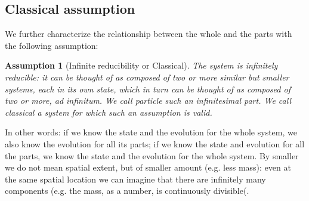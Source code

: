 \documentclass[aps,pra,10pt,twocolumn,floatfix,nofootinbib]{revtex4-1}
\newtheorem{assump}{Assumption}
\theoremstyle{definition}
\begin{document}
\subsection{Classical assumption}




We further characterize the relationship between the whole and the parts with the following assumption:

\begin{assump}[Infinite reducibility or Classical]\label{classical}
The system is infinitely reducible: it can be thought of as composed of two or more similar but smaller systems, each in its own state, which in turn can be thought of as composed of two or more, ad infinitum. We call \emph{particle} such an infinitesimal part. We call \emph{classical} a system for which such an assumption is valid.
\end{assump}

In other words: if we know the state and the evolution for the whole system, we also know the evolution for all its parts; if we know the state and evolution for all the parts, we know the state and the evolution for the whole system. By smaller we do not mean spatial extent, but of smaller amount (e.g. less mass): even at the same spatial location we can imagine that there are infinitely many components (e.g. the mass, as a number, is continuously divisible(.
\end{document}
